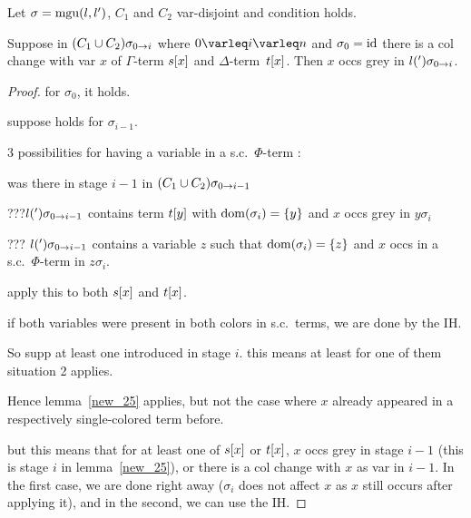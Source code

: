\documentclass[,%
	paper=a4,%
	DIV11, %
	twoside=false,%
	liststotoc,
	bibtotoc,
	draft=false,%
	numbers=noendperiod
]{scrartcl}
\begin{document}
\begin{lemma}
	\label{new_27}
	Let $\sigma = \operatorname{mgu}(l, l')$, $C_1$ and $C_2$ var-disjoint and condition holds.

	Suppose in $(C_1 \cup C_2)\sigma_{0 \rightarrow i}$ where $0\varleq i \varleq n$ and $\sigma_0 = \operatorname{id}$ there is a col change with var $x$ of $\Gamma$-term $s[x]$ and $\Delta$-term~$t[x]$.
	Then $x$ occs grey in $l(')\sigma_{0 \rightarrow i}$.
\end{lemma}
\begin{proof}
	for $\sigma_0$, it holds.

	suppose holds for $\sigma_{i-1}$.

	3 possibilities for having a variable in a s.c.\ $\Phi$-term :
	\begin{compactenum}
	\item was there in stage $i-1$ in $(C_1 \cup C_2)\sigma_{0 \rightarrow i-1}$
	\item ???$l(')\sigma_{0 \rightarrow i-1}$ contains term $t[y]$ with $\operatorname{dom}(\sigma_i) = \{y\}$ and $x$ occs grey in $y\sigma_i$
	\item ??? $l(')\sigma_{0 \rightarrow i-1}$ contains a variable $z$ such that $\operatorname{dom}(\sigma_i) = \{z\}$ and $x$ occs in a s.c.\ $\Phi$-term in $z\sigma_i$.
	\end{compactenum}

	apply this to both $s[x]$ and $t[x]$.

	if both variables were present in both colors in s.c.\ terms, we are done by the IH.

	So supp at least one introduced in stage $i$.
	this means at least for one of them situation 2 applies. 

	Hence lemma~\ref{new_25} applies, but not the case where $x$ already appeared in a respectively single-colored term before.

	but this means that for at least one of $s[x]$ or $t[x]$, $x$ occs grey in stage $i-1$ (this is stage $i$ in lemma~\ref{new_25}), or there is a col change with $x$ as var in $i-1$. 
	In the first case, we are done right away ($\sigma_i$ does not affect $x$ as $x$ still occurs after applying it), and in the second, we can use the IH.
\end{proof}
\end{document}
